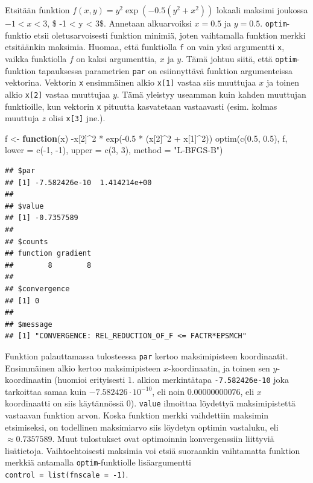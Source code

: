 \documentclass[
]{book}
\newenvironment{Shaded}{\begin{snugshade}}{\end{snugshade}}
\newcommand{\AttributeTok}[1]{\textcolor[rgb]{0.77,0.63,0.00}{#1}}
\newcommand{\ControlFlowTok}[1]{\textcolor[rgb]{0.13,0.29,0.53}{\textbf{#1}}}
\newcommand{\DecValTok}[1]{\textcolor[rgb]{0.00,0.00,0.81}{#1}}
\newcommand{\FloatTok}[1]{\textcolor[rgb]{0.00,0.00,0.81}{#1}}
\newcommand{\FunctionTok}[1]{\textcolor[rgb]{0.00,0.00,0.00}{#1}}
\newcommand{\NormalTok}[1]{#1}
\newcommand{\OtherTok}[1]{\textcolor[rgb]{0.56,0.35,0.01}{#1}}
\newcommand{\SpecialCharTok}[1]{\textcolor[rgb]{0.00,0.00,0.00}{#1}}
\newcommand{\StringTok}[1]{\textcolor[rgb]{0.31,0.60,0.02}{#1}}
\begin{document}
Etsitään funktion \(f(x,y) = y^2\exp(-0.5(y^2+x^2))\) lokaali maksimi joukossa \(-1 < x < 3\), \$ -1 \textless{} y \textless{} 3\$. Annetaan alkuarvoiksi \(x = 0.5\) ja \(y = 0.5\). \texttt{optim}-funktio etsii oletusarvoisesti funktion minimiä, joten vaihtamalla funktion merkki etsitäänkin maksimia. Huomaa, että funktiolla \texttt{f} on vain yksi argumentti \texttt{x}, vaikka funktiolla \(f\) on kaksi argumenttia, \(x\) ja \(y\). Tämä johtuu siitä, että \texttt{optim}-funktion tapauksessa parametrien \texttt{par} on esiinnyttävä funktion argumenteissa vektorina. Vektorin \texttt{x} ensimmäinen alkio \texttt{x{[}1{]}} vastaa siis muuttujaa \(x\) ja toinen alkio \texttt{x{[}2{]}} vastaa muuttujaa \(y\). Tämä yleistyy useamman kuin kahden muuttujan funktioille, kun vektorin \texttt{x} pituutta kasvatetaan vastaavasti (esim. kolmas muuttuja \(z\) olisi \texttt{x{[}3{]}} jne.).

\begin{Shaded}
\begin{Highlighting}[]
\NormalTok{f }\OtherTok{\textless{}{-}} \ControlFlowTok{function}\NormalTok{(x) }\SpecialCharTok{{-}}\NormalTok{x[}\DecValTok{2}\NormalTok{]}\SpecialCharTok{\^{}}\DecValTok{2} \SpecialCharTok{*} \FunctionTok{exp}\NormalTok{(}\SpecialCharTok{{-}}\FloatTok{0.5} \SpecialCharTok{*}\NormalTok{ (x[}\DecValTok{2}\NormalTok{]}\SpecialCharTok{\^{}}\DecValTok{2} \SpecialCharTok{+}\NormalTok{ x[}\DecValTok{1}\NormalTok{]}\SpecialCharTok{\^{}}\DecValTok{2}\NormalTok{))}
\FunctionTok{optim}\NormalTok{(}\FunctionTok{c}\NormalTok{(}\FloatTok{0.5}\NormalTok{, }\FloatTok{0.5}\NormalTok{), f, }\AttributeTok{lower =} \FunctionTok{c}\NormalTok{(}\SpecialCharTok{{-}}\DecValTok{1}\NormalTok{, }\SpecialCharTok{{-}}\DecValTok{1}\NormalTok{), }\AttributeTok{upper =} \FunctionTok{c}\NormalTok{(}\DecValTok{3}\NormalTok{, }\DecValTok{3}\NormalTok{), }\AttributeTok{method =} \StringTok{"L{-}BFGS{-}B"}\NormalTok{)}
\end{Highlighting}
\end{Shaded}

\begin{verbatim}
## $par
## [1] -7.582426e-10  1.414214e+00
## 
## $value
## [1] -0.7357589
## 
## $counts
## function gradient 
##        8        8 
## 
## $convergence
## [1] 0
## 
## $message
## [1] "CONVERGENCE: REL_REDUCTION_OF_F <= FACTR*EPSMCH"
\end{verbatim}

Funktion palauttamassa tulosteessa \texttt{par} kertoo maksimipisteen koordinaatit. Ensimmäinen alkio kertoo maksimipisteen \(x\)-koordinaatin, ja toinen sen \(y\)-koordinaatin (huomioi erityisesti 1. alkion merkintätapa \texttt{-7.582426e-10} joka tarkoittaa samaa kuin \(-7.582426 \cdot 10^{-10}\), eli noin \(0.00000000076\), eli \(x\) koordinaatti on siis käytännössä \(0\)). \texttt{value} ilmoittaa löydettyä maksimipistettä vastaavan funktion arvon. Koska funktion merkki vaihdettiin maksimin etsimiseksi, on todellinen maksimiarvo siis löydetyn optimin vastaluku, eli \(\approx 0.7357589\). Muut tulostukset ovat optimoinnin konvergenssiin liittyviä lisätietoja. Vaihtoehtoisesti maksimia voi etsiä suoraankin vaihtamatta funktion merkkiä antamalla \texttt{optim}-funktiolle lisäargumentti \texttt{control\ =\ list(fnscale\ =\ -1)}.
\end{document}
